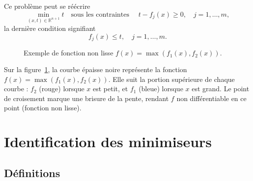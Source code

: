 Ce problème peut se réécrire
\begin{equation}
    \min_{(x,t)\in\mathbb{R}^{n+1}} t
    \quad \text{sous les contraintes } \quad
    t - f_j(x) \ge 0,\quad j=1,\dots,m,
\end{equation}
la dernière condition signifiant
\begin{equation}
    f_j(x) \le t,\quad j=1,\dots,m.
\end{equation}

\begin{figure}[H]
\centering
{}
\caption{Exemple de fonction non lisse $f(x)=\max(f_1(x),f_2(x))$.}
\label{fig:max_func}
\end{figure}

\begin{figureexplanation}
Sur la figure~\ref{fig:max_func}, la courbe épaisse noire représente la fonction $f(x) = \max(f_1(x), f_2(x))$. Elle suit la portion supérieure de chaque courbe : $f_2$ (rouge) lorsque $x$ est petit, et $f_1$ (bleue) lorsque $x$ est grand. Le point de croisement marque une brisure de la pente, rendant $f$ non différentiable en ce point (fonction non lisse).
\end{figureexplanation}

\section{Identification des minimiseurs}
\label{sec:2.2}

\subsection*{Définitions}
\label{subsec:2.2.0}

